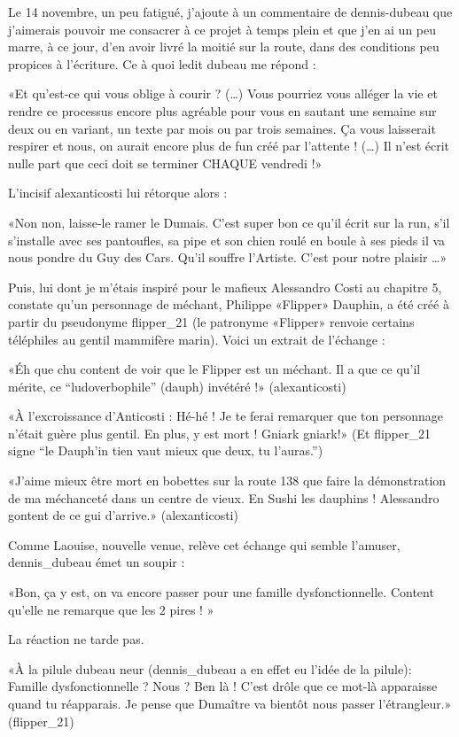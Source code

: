 \begin{Postface}
Le 14 novembre, un peu fatigué, j’ajoute à un commentaire de dennis-dubeau que j’aimerais pouvoir me consacrer à ce projet à temps plein et que j’en ai un peu marre, à ce jour, d’en avoir livré la moitié sur la route, dans des conditions peu propices à l’écriture. Ce à quoi ledit dubeau me répond :

    «Et qu’est-ce qui vous oblige à courir ? (…) Vous pourriez vous alléger la vie et rendre ce processus encore plus agréable pour vous en sautant une semaine sur deux ou en variant, un texte par mois ou par trois semaines. Ça vous laisserait respirer et nous, on aurait encore plus de fun créé par l’attente ! (…) Il n’est écrit nulle part que ceci doit se terminer CHAQUE vendredi !»

L’incisif alexanticosti lui rétorque alors :

    «Non non, laisse-le ramer le Dumais. C’est super bon ce qu’il écrit sur la run, s’il s’installe avec ses pantoufles, sa pipe et son chien roulé en boule à ses pieds il va nous pondre du Guy des Cars. Qu’il souffre l’Artiste. C’est pour notre plaisir …»

Puis, lui dont je m’étais inspiré pour le mafieux Alessandro Costi au chapitre 5, constate qu’un personnage de méchant, Philippe «Flipper» Dauphin, a été créé à partir du pseudonyme flipper_21 (le patronyme «Flipper» renvoie certains téléphiles au gentil mammifère marin). Voici un extrait de l’échange :

    «Éh que chu content de voir que le Flipper est un méchant. Il a que ce qu’il mérite, ce “ludoverbophile” (dauph) invétéré !» (alexanticosti)

    «À l’excroissance d’Anticosti : Hé-hé ! Je te ferai remarquer que ton personnage n’était guère plus gentil. En plus, y est mort ! Gniark gniark!» (Et flipper_21 signe “le Dauph’in tien vaut mieux que deux, tu l’auras.”)

    «J’aime mieux être mort en bobettes sur la route 138 que faire la démonstration de ma méchanceté dans un centre de vieux. En Sushi les dauphins ! Alessandro gontent de ce gui d’arrive.» (alexanticosti)

Comme Laouise, nouvelle venue, relève cet échange qui semble l’amuser, dennis_dubeau émet un soupir :

    «Bon, ça y est, on va encore passer pour une famille dysfonctionnelle. Content qu’elle ne remarque que les 2 pires ! »

La réaction ne tarde pas.

    «À la pilule dubeau neur (dennis_dubeau a en effet eu l’idée de la pilule): Famille dysfonctionnelle ? Nous ? Ben là ! C’est drôle que ce mot-là apparaisse quand tu réapparais. Je pense que Dumaître va bientôt nous passer l’étrangleur.» (flipper_21)


\end{Postface}
